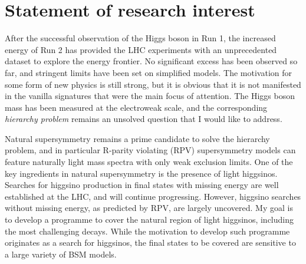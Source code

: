 \setlength{\parskip}{4pt}

\section{Statement of research interest}


\indent After the successful observation of the Higgs boson in Run 1, the increased energy of Run 2 has provided the LHC experiments with an unprecedented dataset to explore the energy frontier. No significant excess has been observed so far, and stringent limits have been set on simplified models.
The motivation for some form of new physics is still strong, but it is obvious that it is not manifested in the vanilla signatures that were the main focus of attention.
The Higgs boson mass has been measured at the electroweak scale, and the corresponding \emph{hierarchy problem} remains an unsolved question that I would like to address.

\hspace{20pt}
Natural supersymmetry remains a prime candidate to solve the hierarchy problem, and in particular R-parity violating (RPV) supersymmetry models can feature naturally light mass spectra with only weak exclusion limits. One of the key ingredients in natural supersymmetry is the presence of light higgsinos. Searches for higgsino production in final states with missing energy are well established at the LHC, and will continue progressing. However, higgsino searches without missing energy, as predicted by RPV, are largely uncovered. My goal is to develop a programme to cover the natural region of light higgsinos, including the most challenging decays. While the motivation to develop such programme originates as a search for higgsinos, the final states to be covered are sensitive to a large variety of BSM models.%

